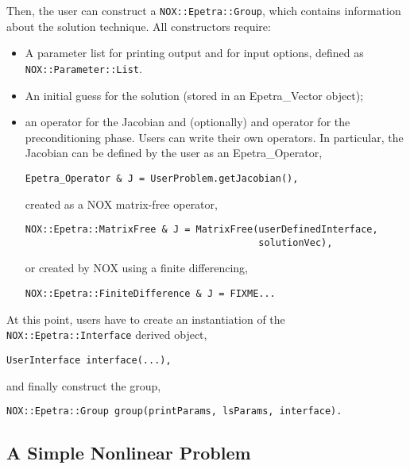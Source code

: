 Then, the user can construct a \verb!NOX::Epetra::Group!, which contains
information about the solution technique. All constructors require:
\begin{itemize}
\item A parameter list for printing output and for input options,
  defined as \verb!NOX::Parameter::List!. 
\item An initial guess for the solution (stored in an Epetra\_Vector
  object);
\item an operator for the Jacobian and (optionally) and operator for the
  preconditioning phase. Users can write their own operators. In
  particular, the Jacobian can be defined by the user as an
  Epetra\_Operator,
\begin{verbatim}
Epetra_Operator & J = UserProblem.getJacobian(),
\end{verbatim}
created as a NOX matrix-free operator,
\begin{verbatim}
NOX::Epetra::MatrixFree & J = MatrixFree(userDefinedInterface, 
                                         solutionVec),
\end{verbatim}
or created by NOX using a finite differencing,
\begin{verbatim}
NOX::Epetra::FiniteDifference & J = FIXME...
\end{verbatim}
\end{itemize}

At this point, users have to create an instantiation of the
\verb!NOX::Epetra::Interface! derived object,
\begin{verbatim}
UserInterface interface(...),
\end{verbatim}
and finally construct the group,
\begin{verbatim}
NOX::Epetra::Group group(printParams, lsParams, interface).
\end{verbatim}





\subsection{A Simple Nonlinear Problem}
\label{sec:nox_simple}


